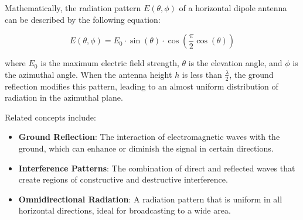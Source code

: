 Mathematically, the radiation pattern \(E(\theta, \phi)\) of a horizontal dipole antenna can be described by the following equation:

\[
E(\theta, \phi) = E_0 \cdot \sin(\theta) \cdot \cos\left(\frac{\pi}{2} \cos(\theta)\right)
\]

where \(E_0\) is the maximum electric field strength, \(\theta\) is the elevation angle, and \(\phi\) is the azimuthal angle. When the antenna height \(h\) is less than \(\frac{\lambda}{2}\), the ground reflection modifies this pattern, leading to an almost uniform distribution of radiation in the azimuthal plane.

Related concepts include:
\begin{itemize}
    \item \textbf{Ground Reflection}: The interaction of electromagnetic waves with the ground, which can enhance or diminish the signal in certain directions.
    \item \textbf{Interference Patterns}: The combination of direct and reflected waves that create regions of constructive and destructive interference.
    \item \textbf{Omnidirectional Radiation}: A radiation pattern that is uniform in all horizontal directions, ideal for broadcasting to a wide area.
\end{itemize}

